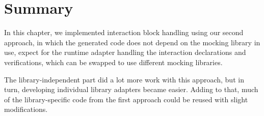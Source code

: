 \section{Summary}
In this chapter,
we implemented interaction block handling
using our second approach,
in which the generated code does not depend
on the mocking library in use,
expect for the runtime adapter
handling the interaction declarations and verifications,
which can be swapped to use different mocking libraries.

The library-independent part did a lot more work with this approach,
but in turn, developing individual library adapters became easier.
Adding to that, much of the library-specific code from the first approach
could be reused with slight modifications.
